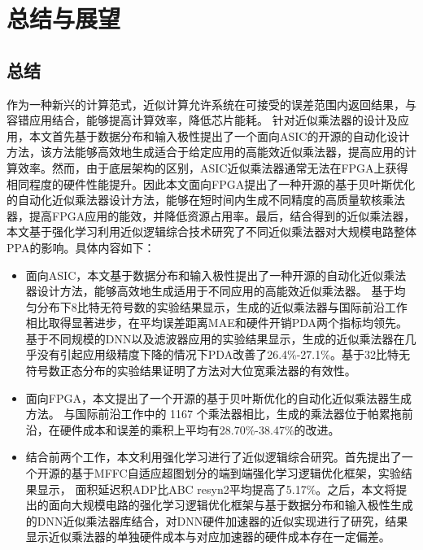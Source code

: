 \chapter{总结与展望}

\section{总结}

作为一种新兴的计算范式，近似计算允许系统在可接受的误差范围内返回结果，与容错应用结合，能够提高计算效率，降低芯片能耗。
针对近似乘法器的设计及应用，本文首先基于数据分布和输入极性提出了一个面向ASIC的开源的自动化设计方法，该方法能够高效地生成适合于给定应用的高能效近似乘法器，提高应用的计算效率。然而，由于底层架构的区别，ASIC近似乘法器通常无法在FPGA上获得相同程度的硬件性能提升。因此本文面向FPGA提出了一种开源的基于贝叶斯优化的自动化近似乘法器设计方法，能够在短时间内生成不同精度的高质量软核乘法器，提高FPGA应用的能效，并降低资源占用率。最后，结合得到的近似乘法器，本文基于强化学习利用近似逻辑综合技术研究了不同近似乘法器对大规模电路整体PPA的影响。具体内容如下：

\begin{itemize}
    \item 面向ASIC，本文基于数据分布和输入极性提出了一种开源的自动化近似乘法器设计方法，能够高效地生成适用于不同应用的高能效近似乘法器。
    基于均匀分布下8比特无符号数的实验结果显示，生成的近似乘法器与国际前沿工作相比取得显著进步，在平均误差距离MAE和硬件开销PDA两个指标均领先。基于不同规模的DNN以及滤波器应用的实验结果显示，生成的近似乘法器在几乎没有引起应用级精度下降的情况下PDA改善了26.4\%-27.1\%。基于32比特无符号数正态分布的实验结果证明了方法对大位宽乘法器的有效性。

    \item 面向FPGA，本文提出了一个开源的基于贝叶斯优化的自动化近似乘法器生成方法。
    与国际前沿工作中的 1167 个乘法器相比，生成的乘法器位于帕累拖前沿，在硬件成本和误差的乘积上平均有28.70\%-38.47\%的改进。

    \item 结合前两个工作，本文利用强化学习进行了近似逻辑综合研究。首先提出了一个开源的基于MFFC自适应超图划分的端到端强化学习逻辑优化框架，实验结果显示，
    面积延迟积ADP比ABC resyn2平均提高了5.17\%。之后，本文将提出的面向大规模电路的强化学习逻辑优化框架与基于数据分布和输入极性生成的DNN近似乘法器库结合，对DNN硬件加速器的近似实现进行了研究，结果显示近似乘法器的单独硬件成本与对应加速器的硬件成本存在一定偏差。
\end{itemize}

